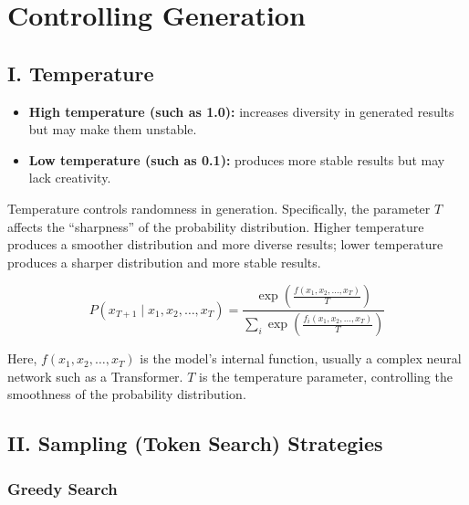 \setcounter{section}{2}

\hypertarget{controlling-generation}{%
\section{Controlling Generation}\label{controlling-generation}}

\hypertarget{i.-temperature}{%
\subsection{I. Temperature}\label{i.-temperature}}

\begin{itemize}
\tightlist
\item
  \textbf{High temperature (such as 1.0):} increases diversity in generated results but may make them unstable.
\item
  \textbf{Low temperature (such as 0.1):} produces more stable results but may lack creativity.
\end{itemize}

Temperature controls randomness in generation. Specifically, the parameter \(T\) affects the ``sharpness'' of the probability distribution. Higher temperature produces a smoother distribution and more diverse results; lower temperature produces a sharper distribution and more stable results.

\[
P(x_{T+1} \mid x_1, x_2, \ldots, x_T) =
\frac{\exp\left(\frac{f(x_1,x_2,\ldots,x_T)}{T}\right)}
{\sum_i \exp\left(\frac{f_i(x_1,x_2,\ldots,x_T)}{T}\right)}
\]

Here, \(f(x_1,x_2,\ldots,x_T)\) is the model's internal function, usually a complex neural network such as a Transformer. \(T\) is the temperature parameter, controlling the smoothness of the probability distribution.

\hypertarget{ii.-sampling-token-search-strategies}{%
\subsection{II. Sampling (Token Search) Strategies}\label{ii.-sampling-token-search-strategies}}

\hypertarget{greedy-search}{%
\subsubsection{Greedy Search}\label{greedy-search}}

